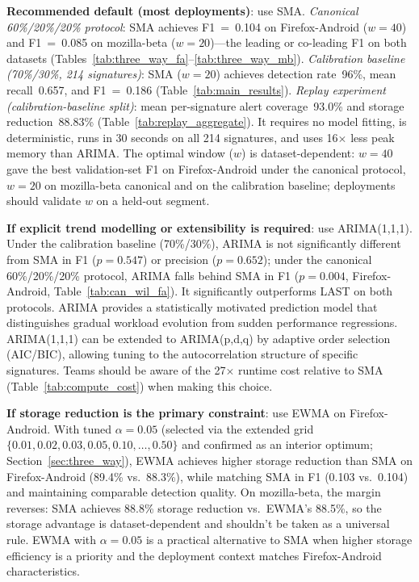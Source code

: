 \documentclass[a4paper,fleqn]{cas-sc}
\theoremstyle{plain}
\begin{document}
\textbf{Recommended default (most deployments)}: use SMA.
\textit{Canonical 60\%/20\%/20\% protocol}: SMA achieves F1~=~0.104 on
Firefox-Android ($w=40$) and F1~=~0.085 on mozilla-beta ($w=20$)---the
leading or co-leading F1 on both datasets
(Tables~\ref{tab:three_way_fa}--\ref{tab:three_way_mb}).
\textit{Calibration baseline (70\%/30\%, 214 signatures)}: SMA ($w=20$)
achieves detection rate~96\%, mean recall~0.657, and F1~=~0.186
(Table~\ref{tab:main_results}).
\textit{Replay experiment (calibration-baseline split)}: mean per-signature
alert coverage~93.0\% and storage reduction~88.83\%
(Table~\ref{tab:replay_aggregate}).
It requires no model fitting, is deterministic, runs in 30 seconds on
all 214 signatures, and uses 16$\times$ less peak memory than ARIMA.
The optimal window ($w$) is dataset-dependent: $w=40$ gave the best
validation-set F1 on Firefox-Android under the canonical protocol, $w=20$
on mozilla-beta canonical and on the calibration baseline; deployments
should validate $w$ on a held-out segment.

\textbf{If explicit trend modelling or extensibility is required}: use
ARIMA(1,1,1).
Under the calibration baseline (70\%/30\%), ARIMA is not significantly
different from SMA in F1 ($p=0.547$) or precision ($p=0.652$); under
the canonical 60\%/20\%/20\% protocol, ARIMA falls behind SMA in F1
($p=0.004$, Firefox-Android, Table~\ref{tab:can_wil_fa}).
It significantly outperforms LAST on both protocols.
ARIMA provides a statistically motivated prediction model that distinguishes
gradual workload evolution from sudden performance regressions.
ARIMA(1,1,1) can be extended to ARIMA(p,d,q) by adaptive order selection
(AIC/BIC), allowing tuning to the autocorrelation structure of specific
signatures.
Teams should be aware of the 27$\times$ runtime cost relative to SMA
(Table~\ref{tab:compute_cost}) when making this choice.

\textbf{If storage reduction is the primary constraint}: use EWMA on
Firefox-Android.
With tuned $\alpha=0.05$ (selected via the extended grid
$\{0.01, 0.02, 0.03, 0.05, 0.10, \ldots, 0.50\}$ and confirmed as an interior
optimum; Section~\ref{sec:three_way}), EWMA achieves
higher storage reduction than SMA on Firefox-Android (89.4\% vs.\ 88.3\%),
while matching SMA in F1 (0.103 vs.\ 0.104) and maintaining comparable
detection quality.
On mozilla-beta, the margin reverses: SMA achieves 88.8\% storage reduction
vs.\ EWMA's 88.5\%, so the storage advantage is dataset-dependent and
shouldn't be taken as a universal rule.
EWMA with $\alpha=0.05$ is a practical alternative to SMA when higher
storage efficiency is a priority and the deployment context matches
Firefox-Android characteristics.
\end{document}
